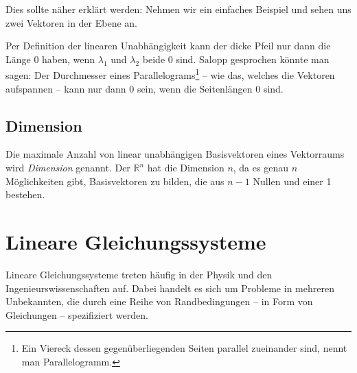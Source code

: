 Dies sollte näher erklärt werden: Nehmen wir ein einfaches Beispiel und sehen uns zwei Vektoren in der Ebene an. 

\bigskip

\begin{center}
\end{center}

\bigskip

Per Definition der linearen Unabhängigkeit kann der dicke Pfeil nur dann die Länge 0 haben, wenn $\lambda_1$ und $\lambda_2$ beide 0 sind. Salopp gesprochen könnte man sagen: Der Durchmesser eines Parallelograms\footnote{Ein Viereck dessen gegenüberliegenden Seiten parallel zueinander sind, nennt man Parallelogramm.} -- wie das, welches die Vektoren aufspannen -- kann nur dann 0 sein, wenn die Seitenlängen 0 sind.

\subsection{Dimension}

\begin{definition}
Die maximale Anzahl von linear unabhängigen Basisvektoren eines Vektorraums wird \textsl{Dimension} genannt. Der $\mathbb{R}^n$ hat die Dimension $n$, da es genau $n$ Möglichkeiten gibt, Basisvektoren zu bilden, die aus $n-1$ Nullen und einer 1 bestehen.
\end{definition}


\section{Lineare Gleichungssysteme}

Lineare Gleichungssysteme treten häufig in der Physik und den Ingenieurswissenschaften auf. Dabei handelt es sich um Probleme in mehreren Unbekannten, die durch eine Reihe von Randbedingungen -- in Form von Gleichungen -- spezifiziert werden.


